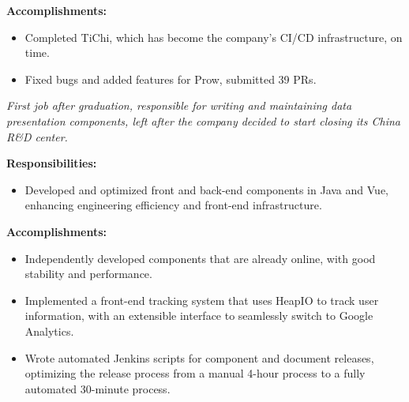 \documentclass{software_engineer_rustin_liu}
\newcommand{\en}[1]{#1}
\newcommand{\zh}[1]{}
\begin{document}
\en{\textbf{Accomplishments:}}
\zh{\textbf{产出：}}
\begin{itemize}
      \item \en{Completed TiChi, which has become the company's CI/CD infrastructure, on time.}
            \zh{按时完成了项目的设计和开发，TiChi 已经成为了公司 CI/CD 的基础设施。}
      \item \en{Fixed bugs and added features for Prow, submitted 39 PRs.}
            \zh{为 Prow 修复 bug 和添加功能，提交了 39 个 PR。}
\end{itemize}

\en{}
\zh{\datedsubsection{\textbf{\href{https://www.morningstar.com/}{晨星资讯（Morningstar, Inc.）- 金融服务 - 前后端开发工程师（Java/JS）}}}{2019/06 -- 2020/07}}
\en{\textsl{First job after graduation, responsible for writing and maintaining data presentation components, left after the company decided to start closing its China R\&D center.}}
\zh{\textsl{毕业后第一份工作，负责编写和维护数据展示组件，在公司决定开始关闭中国研发中心后离职。}}

\en{\textbf{Responsibilities:}}
\zh{\textbf{职责：}}
\begin{itemize}
      \item \en{Developed and optimized front and back-end components in Java and Vue, enhancing engineering efficiency and front-end infrastructure.}
            \zh{使用 Java 和 Vue 开发和优化前后端组件，提升工程效率和前端基础设施。}
\end{itemize}

\en{\textbf{Accomplishments:}}
\zh{\textbf{产出：}}
\begin{itemize}
      \item \en{Independently developed components that are already online, with good stability and performance.}
            \zh{多个独立开发的组件已经上线使用，有较好的稳定性和性能。}
      \item \en{Implemented a front-end tracking system that uses HeapIO to track user information, with an extensible interface to seamlessly switch to Google Analytics.}
            \zh{实现了前端的 tracking 系统，使用 HeapIO 追踪用户信息，并预留可扩展接口，可无缝切换至 Google Analytics。}
      \item \en{Wrote automated Jenkins scripts for component and document releases, optimizing the release process from a manual 4-hour process to a fully automated 30-minute process.}
            \zh{为组件和文档发布编写了自动化 Jenkins 脚本，将发布流程从手动 4 小时优化到全自动 30 分钟。}
\end{itemize}
\end{document}
